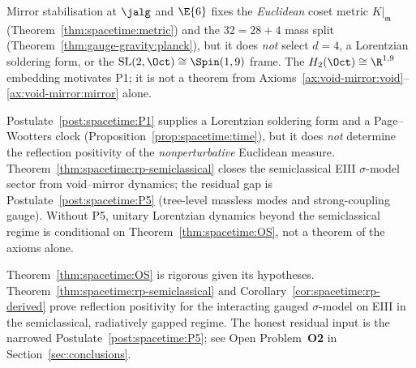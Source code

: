 \begin{proposition}
\label{prop:spacetime:p1-nogo}
Mirror stabilisation at $\jalg$ and $\E{6}$ fixes the \emph{Euclidean}
coset metric $K|_{\mathfrak{m}}$ (Theorem~\ref{thm:spacetime:metric}) and
the $32=28+4$ mass split (Theorem~\ref{thm:gauge-gravity:planck}), but it
does \emph{not} select $d=4$, a Lorentzian soldering form, or the
$\mathrm{SL}(2,\Oct)\cong\Spin(1,9)$ frame. The $H_2(\Oct)\cong\R^{1,9}$
embedding motivates P1; it is not a theorem from
Axioms~\ref{ax:void-mirror:void}--\ref{ax:void-mirror:mirror} alone.
\end{proposition}

\begin{proposition}
\label{prop:spacetime:rp-nogo}
Postulate~\ref{post:spacetime:P1} supplies a Lorentzian soldering form and
a Page--Wootters clock (Proposition~\ref{prop:spacetime:time}), but it does
\emph{not} determine the reflection positivity of the \emph{nonperturbative}
Euclidean measure. Theorem~\ref{thm:spacetime:rp-semiclassical} closes the
semiclassical EIII $\sigma$-model sector from void--mirror dynamics; the
residual gap is Postulate~\ref{post:spacetime:P5} (tree-level massless modes
and strong-coupling gauge). Without P5, unitary Lorentzian dynamics beyond
the semiclassical regime is conditional on
Theorem~\ref{thm:spacetime:OS}, not a theorem of the axioms alone.
\end{proposition}

\begin{remark}[Status]
Theorem~\ref{thm:spacetime:OS} is rigorous given its hypotheses.
Theorem~\ref{thm:spacetime:rp-semiclassical} and
Corollary~\ref{cor:spacetime:rp-derived} prove reflection positivity for the
interacting gauged $\sigma$-model on EIII in the semiclassical, radiatively
gapped regime. The honest residual input is the narrowed
Postulate~\ref{post:spacetime:P5}; see Open Problem~\textbf{O2} in
Section~\ref{sec:conclusions}.
\end{remark}